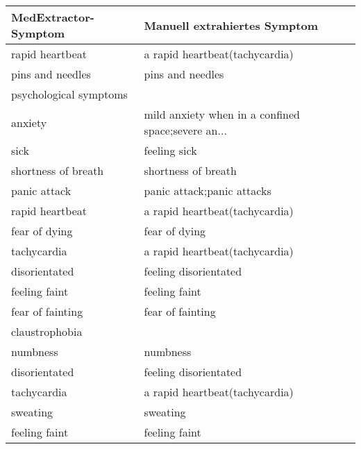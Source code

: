 \begin{table}[H]
\begin{center}
\begin{tabular}{ll}
\toprule
  MedExtractor-Symptom &                       Manuell extrahiertes Symptom \\
\midrule
                    rapid heartbeat &                     a rapid heartbeat(tachycardia) \\
      pins and needles &                                   pins and needles \\

psychological symptoms &                                                    \\
               anxiety & mild anxiety when in a confined space;severe an... \\
                  sick &                                       feeling sick \\
   shortness of breath &                                shortness of breath \\
          panic attack &                         panic attack;panic attacks \\
       rapid heartbeat &                     a rapid heartbeat(tachycardia) \\
         fear of dying &                                      fear of dying \\
           tachycardia &                     a rapid heartbeat(tachycardia) \\
         disorientated &                              feeling disorientated \\
         feeling faint &                                      feeling faint \\
      fear of fainting &                                   fear of fainting \\
        claustrophobia &                                                    \\
              numbness &                                           numbness \\
         disorientated &                              feeling disorientated \\
           tachycardia &                     a rapid heartbeat(tachycardia) \\
              sweating &                                           sweating \\
         feeling faint &                                      feeling faint \\

\end{tabular}
\end{center}
\end{table}
